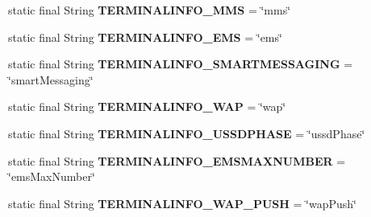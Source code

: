 \begin{DoxyCompactItemize}
\item 
\hypertarget{classcom_1_1bluevia_1_1directory_1_1data_1_1FilterConstants_a2f19abf200929b115529cad9a7cbd05d}{
static final String {\bfseries TERMINALINFO\_\-MMS} = \char`\"{}mms\char`\"{}}
\label{classcom_1_1bluevia_1_1directory_1_1data_1_1FilterConstants_a2f19abf200929b115529cad9a7cbd05d}

\item 
\hypertarget{classcom_1_1bluevia_1_1directory_1_1data_1_1FilterConstants_a11a332d68cdf8f0653324e7ef0e6fdfe}{
static final String {\bfseries TERMINALINFO\_\-EMS} = \char`\"{}ems\char`\"{}}
\label{classcom_1_1bluevia_1_1directory_1_1data_1_1FilterConstants_a11a332d68cdf8f0653324e7ef0e6fdfe}

\item 
\hypertarget{classcom_1_1bluevia_1_1directory_1_1data_1_1FilterConstants_acb59b3c19d5da0ecd28c6a1ca3ce784d}{
static final String {\bfseries TERMINALINFO\_\-SMARTMESSAGING} = \char`\"{}smartMessaging\char`\"{}}
\label{classcom_1_1bluevia_1_1directory_1_1data_1_1FilterConstants_acb59b3c19d5da0ecd28c6a1ca3ce784d}

\item 
\hypertarget{classcom_1_1bluevia_1_1directory_1_1data_1_1FilterConstants_a203d8831ccf3101985e2dd33e68e7ff2}{
static final String {\bfseries TERMINALINFO\_\-WAP} = \char`\"{}wap\char`\"{}}
\label{classcom_1_1bluevia_1_1directory_1_1data_1_1FilterConstants_a203d8831ccf3101985e2dd33e68e7ff2}

\item 
\hypertarget{classcom_1_1bluevia_1_1directory_1_1data_1_1FilterConstants_a7b0adf74420737535e072372e1bab504}{
static final String {\bfseries TERMINALINFO\_\-USSDPHASE} = \char`\"{}ussdPhase\char`\"{}}
\label{classcom_1_1bluevia_1_1directory_1_1data_1_1FilterConstants_a7b0adf74420737535e072372e1bab504}

\item 
\hypertarget{classcom_1_1bluevia_1_1directory_1_1data_1_1FilterConstants_a9d8800d782959454518ad0c0dcef5b6d}{
static final String {\bfseries TERMINALINFO\_\-EMSMAXNUMBER} = \char`\"{}emsMaxNumber\char`\"{}}
\label{classcom_1_1bluevia_1_1directory_1_1data_1_1FilterConstants_a9d8800d782959454518ad0c0dcef5b6d}

\item 
\hypertarget{classcom_1_1bluevia_1_1directory_1_1data_1_1FilterConstants_a8344395e69634fdd82c674f736fa0bc2}{
static final String {\bfseries TERMINALINFO\_\-WAP\_\-PUSH} = \char`\"{}wapPush\char`\"{}}
\label{classcom_1_1bluevia_1_1directory_1_1data_1_1FilterConstants_a8344395e69634fdd82c674f736fa0bc2}


\end{DoxyCompactItemize}
